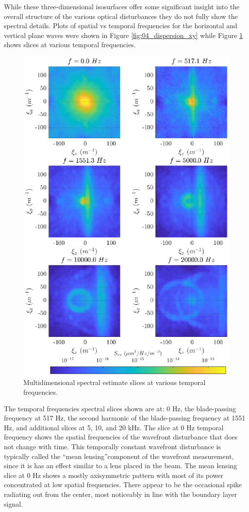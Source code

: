 While these three-dimensional isosurfaces offer some significant insight into the overall structure of the various optical disturbances they do not fully show the spectral details.
Plots of spatial vs temporal frequencies for the horizontal and vertical plane waves were shown in Figure \ref{fig:04_dispersion_xy} while Figure \ref{fig:04_dispersion_slices} shows slices at various temporal frequencies.
\begin{figure}
  \centering
  \includegraphics{../matlab/04_dispersion_analysis/dispersion_slices.eps}
  \caption{Multidimensional spectral estimate slices at various temporal frequencies.}
  \label{fig:04_dispersion_slices}
\end{figure}
The temporal frequencies spectral slices shown are at: 0 Hz, the blade-passing frequency at 517 Hz, the second harmonic of the blade-passing frequency at 1551 Hz, and additional slices at 5, 10, and 20 kHz.
The slice at 0 Hz temporal frequency shows the spatial frequencies of the wavefront disturbance that does not change with time.
This temporally constant wavefront disturbance is typically called the ``mean lensing''component of the wavefront measurement, since it is has an effect similar to a lens placed in the beam.
The mean lensing slice at 0 Hz shows a mostly axisymmetric pattern with most of its power concentrated at low spatial frequencies.
There appear to be the occasional spike radiating out from the center, most noticeably in line with the boundary layer signal.

